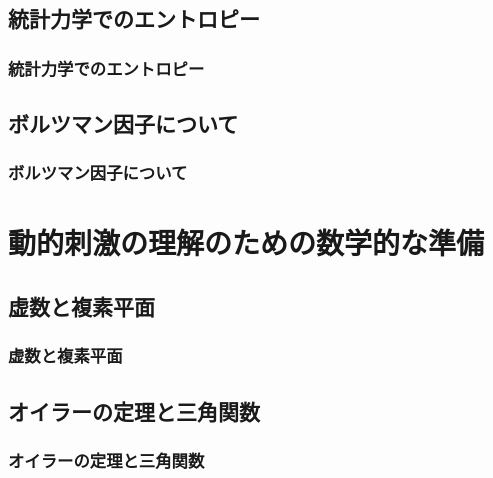 \documentclass[12pt, dvipdfmx]{beamer}
\newcommand{\backupbegin}{
   \newcounter{framenumberappendix}
   \setcounter{framenumberappendix}{\value{framenumber}}
}
\begin{document}
\subsection{統計力学でのエントロピー}
\begin{frame}
	\frametitle{統計力学でのエントロピー}

\end{frame}

\subsection{ボルツマン因子について}
\begin{frame}
	\frametitle{ボルツマン因子について}

\end{frame}

\section{動的刺激の理解のための数学的な準備}
\subsection{虚数と複素平面}
\begin{frame}
	\frametitle{虚数と複素平面}

\end{frame}

\subsection{オイラーの定理と三角関数}
\begin{frame}
	\frametitle{オイラーの定理と三角関数}

\end{frame}


\end{document}
